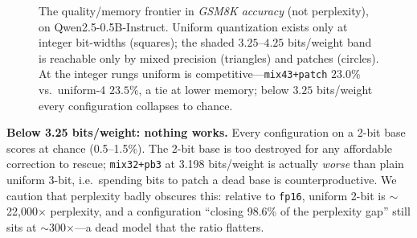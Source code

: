 \documentclass[manuscript, screen, review]{jair}
\newcommand{\bpw}{bits/weight}
\newcommand{\code}[1]{\texttt{#1}}
\begin{document}
\begin{figure}[t]
\centering
{}
\caption{The quality/memory frontier in \emph{GSM8K accuracy} (not perplexity),
on Qwen2.5-0.5B-Instruct. Uniform quantization exists only at integer
bit-widths (squares); the shaded $3.25$--$4.25$ \bpw{} band is reachable only by
mixed precision (triangles) and patches (circles). At the integer rungs uniform
is competitive---\code{mix43+patch} $23.0\%$ vs.\ uniform-4 $23.5\%$, a tie at
lower memory; below $3.25$ \bpw{} every configuration collapses to chance.}
\label{fig:frontier}
\end{figure}

\textbf{Below 3.25 \bpw{}: nothing works.} Every configuration on a 2-bit base
scores at chance (0.5--1.5\%). The 2-bit base is too destroyed for any
affordable correction to rescue; \code{mix32+pb3} at 3.198 \bpw{} is actually
\emph{worse} than plain uniform 3-bit, i.e.\ spending bits to patch a dead base
is counterproductive. We caution that perplexity badly obscures this: relative
to \code{fp16}, uniform 2-bit is $\sim$22{,}000$\times$ perplexity, and a
configuration ``closing 98.6\% of the perplexity gap'' still sits at
$\sim$300$\times$---a dead model that the ratio flatters.
\end{document}
